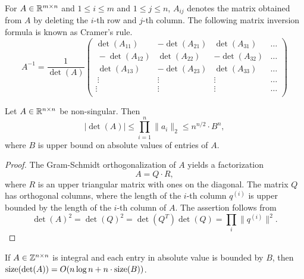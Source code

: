  For $A \in \mathbb{R}^{m\times n}$ and $1\leq i\leq m$ and $1\leq j\leq
 n$, $A_{ij}$ denotes the matrix obtained from $A$ by deleting the
 $i$-th row and $j$-th column.
The following 
matrix inversion formula is known as Cramer's rule. 
\begin{displaymath}
  A^{-1} = \frac{1}{\det(A)}
  \begin{pmatrix}
    \det(A_{11}) & - \det(A_{21}) & \det(A_{31}) & \hdots  \\\
    -\det(A_{12}) &  \det(A_{22}) & - \det(A_{32}) & \hdots \\\
    \det(A_{13}) & - \det(A_{23}) & \det(A_{33}) & \hdots \\\
    \vdots          &     \vdots        & \vdots          & \hdots \\
    \vdots          &     \vdots        & \vdots          & \hdots \\
  \end{pmatrix}
\end{displaymath}

\begin{theorem} 
  Let $A \in \mathbb{R}^{n \times n}$ be non-singular. Then 
  \begin{displaymath}
    |\det(A)| \leq \prod_{i=1}^n \|a_i\|_2 \leq n^{n/2} \cdot B^n, 
  \end{displaymath}
  where $B$ is upper bound on absolute values of entries of $A$.
\end{theorem}

\begin{proof}
  The Gram-Schmidt orthogonalization of $A$ yields a factorization 
  \begin{displaymath}
    A = Q \cdot R,
  \end{displaymath}
where $R$ is an upper triangular matrix with ones on the diagonal. The matrix $Q$ has orthogonal columns, where the length of the $i$-th column $q^{(i)}$ is upper bounded by the length of the $i$-th column of $A$. 
The assertion follows from 
\begin{displaymath}
  \det(A)^2 = \det(Q)^2 = \det(Q^T) \det(Q) = \prod_i \|q^{(i)}\|^2. 
\end{displaymath}
\end{proof}



\begin{corollary}
  If $A\in \mathbb{Z}^{n\times n}$ is integral and each entry in absolute
  value is bounded by $B$, then $\operatorname{size}(\det(A)) = O(n \log n+ n \cdot
  \operatorname{size}(B))$.
\end{corollary}
% 
  
